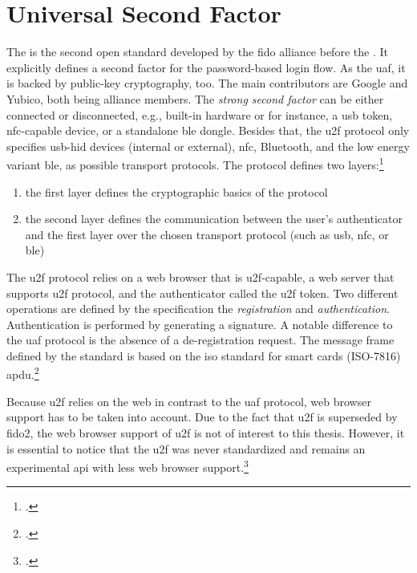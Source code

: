 \section{Universal Second Factor}
\label{mfa:u2f}

The  is the second open standard developed by the \gls{fido} alliance before the \wa. It explicitly defines a second factor for the password-based login flow. As the \gls{uaf}, it is backed by public-key cryptography, too. The main contributors are Google and Yubico, both being alliance members. The \textit{strong second factor} can be either connected or disconnected, e.g., built-in hardware or for instance, a \gls{usb} token, \gls{nfc}-capable device, or a standalone \gls{ble} dongle. Besides that, the \gls{u2f} protocol only specifies \gls{usb}-\gls{hid} devices (internal or external), \gls{nfc}, Bluetooth, and the low energy variant \gls{ble}, as possible transport protocols. The protocol defines two layers:\footcites[See][4]{u2f-overview}[See][4]{u2f-js-api}

\begin{enumerate}
	\item the first layer defines the cryptographic basics of the protocol
	\item the second layer defines the communication between the user's authenticator and the first layer over the chosen transport protocol (such as \gls{usb}, \gls{nfc}, or \gls{ble})
\end{enumerate}

The \gls{u2f} protocol relies on a web browser that is \gls{u2f}-capable, a web server that supports \gls{u2f} protocol, and the authenticator called the \gls{u2f} token. Two different operations are defined by the specification the \textit{registration} and \textit{authentication}. Authentication is performed by generating a signature. A notable difference to the \gls{uaf} protocol is the absence of a de-registration request. The message frame defined by the standard is based on the \gls{iso} standard for smart cards (ISO-7816) \gls{apdu}.\footcites[See][3]{7860546}[See][3]{u2f-raw-message}

Because \gls{u2f} relies on the web in contrast to the \gls{uaf} protocol, web browser support has to be taken into account. Due to the fact that \gls{u2f} is superseded by \gls{fido}2, the web browser support of \gls{u2f} is not of interest to this thesis. However, it is essential to notice that the \gls{u2f} was never standardized and remains an experimental \gls{api} with less web browser support.\footcites[See][31]{fido-ct-5}

